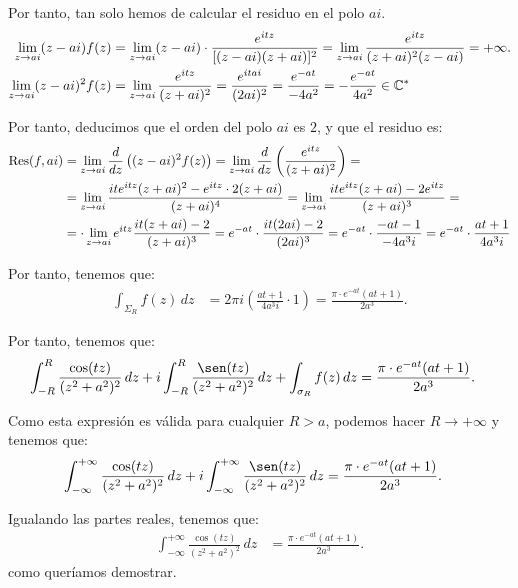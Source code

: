 \begin{ejercicio}
    Por tanto, tan solo hemos de calcular el residuo en el polo $ai$.
    \begin{align*}
        \lim_{z\to ai} (z - ai)f(z) &= \lim_{z\to ai} (z - ai)\cdot \frac{e^{i t z}}{[(z - ai)(z + ai)]^2}
        = \lim_{z\to ai} \frac{e^{i t z}}{(z + ai)^2(z - ai)} = +\infty.\\
        \lim_{z\to ai} (z - ai)^2f(z) &= \lim_{z\to ai} \frac{e^{i t z}}{(z + ai)^2}
        = \frac{e^{i t ai}}{(2ai)^2} = \frac{e^{-at}}{-4a^2} = -\frac{e^{-at}}{4a^2}\in \mathbb{C}^*
    \end{align*}

    Por tanto, deducimos que el orden del polo $ai$ es $2$, y que el residuo es:
    \begin{align*}
        \operatorname{Res}(f, ai) &= \lim_{z\to ai} \dfrac{d}{dz}\left((z - ai)^2f(z)\right)
        = \lim_{z\to ai} \dfrac{d}{dz}\left(\frac{e^{i t z}}{(z + ai)^2}\right)
        =\\&= \lim_{z\to ai} \frac{i t e^{i t z}(z + ai)^2 - e^{i t z}\cdot 2(z + ai)}{(z + ai)^4}
        = \lim_{z\to ai} \frac{i t e^{i t z}(z + ai) - 2e^{i t z}}{(z + ai)^3}
        =\\&= \cdot \lim_{z\to ai} e^{i t z} \frac{i t (z + ai) - 2}{(z + ai)^3}
        = e^{-at}\cdot \dfrac{i t (2ai) - 2}{(2ai)^3}
        = e^{-at}\cdot \dfrac{-at -1}{-4a^3i}
        = e^{-at}\cdot \dfrac{at+1}{4a^3i}
    \end{align*}

    Por tanto, tenemos que:
    \begin{align*}
        \int_{\Sigma_R} f(z) \, dz &= 2\pi i\left(\frac{at + 1}{4a^3i} \cdot 1\right)
        = \frac{\pi\cdot e^{-at}(at + 1)}{2a^3}.
    \end{align*}

    Por tanto, tenemos que:
    \begin{align*}
        \int_{-R}^{R} \frac{\cos(t z)}{(z^2 + a^2)^2} \, dz + i\int_{-R}^{R} \frac{\sen(t z)}{(z^2 + a^2)^2} \, dz + \int_{\sigma_R} f(z) \, dz &= \frac{\pi\cdot e^{-at}(at + 1)}{2a^3}.
    \end{align*}

    Como esta expresión es válida para cualquier $R > a$, podemos hacer $R \to +\infty$ y tenemos que:
    \begin{align*}
        \int_{-\infty}^{+\infty} \frac{\cos(t z)}{(z^2 + a^2)^2} \, dz + i\int_{-\infty}^{+\infty} \frac{\sen(t z)}{(z^2 + a^2)^2} \, dz &= \frac{\pi\cdot e^{-at}(at + 1)}{2a^3}.
    \end{align*}

    Igualando las partes reales, tenemos que:
    \begin{align*}
        \int_{-\infty}^{+\infty} \frac{\cos(t z)}{(z^2 + a^2)^2} \, dz &= \frac{\pi\cdot e^{-at}(at + 1)}{2a^3}.
    \end{align*}
    como queríamos demostrar.
\end{ejercicio}

